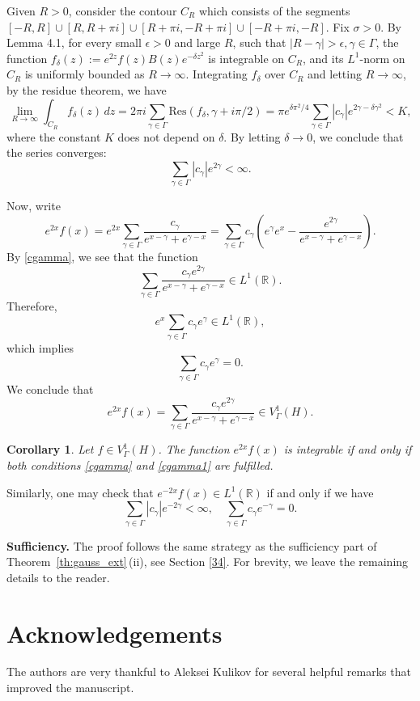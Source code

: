 \documentclass[12pt]{amsart}
\numberwithin{equation}{section}
\theoremstyle{plain}
\newtheorem{corollary}[theorem]{Corollary}
\theoremstyle{definition}
\newcommand{\R}{{\mathbb R}} \newcommand{\Q}{{\mathbb Q}} \newcommand{\Z}{{\mathbb Z}} \newcommand{\N}{{\mathbb N}}
\begin{document}
Given $R>0$, consider the contour $C_R$ which consists of the segments $[-R,R]\cup[R,R+\pi i]\cup[R+\pi i, -R+\pi i]\cup[-R+\pi i,-R]$. Fix $\sigma>0$. By  Lemma 4.1, for every small $\epsilon>0$ and large $R$, such that $|R-\gamma|>\epsilon,\gamma\in\Gamma$, the function $f_\delta(z):=e^{2z}f(z)B(z)e^{-\delta z^2}$ is integrable on $C_R$, and its $L^1$-norm on $C_R$ is uniformly bounded as $R\to\infty$. Integrating $f_\delta$ over $C_R$ and letting $R\to\infty $, by the residue theorem, we have 
$$\lim\limits_{R \to \infty}\int_{C_R}f_\delta(z)\,dz=2\pi i \sum_{\gamma\in\Gamma}\text{Res}(f_\delta,\gamma+i\pi/2)=\pi e^{\delta\pi^2/4}\sum_{\gamma\in\Gamma}|c_\gamma|e^{2\gamma-\delta \gamma^2}<K,$$where the constant $K$ does not depend on $\delta.$ By letting $\delta\to 0$, we conclude that the series converges:
\begin{equation}\label{cgamma}\sum_{\gamma\in\Gamma}|c_\gamma|e^{2\gamma}<\infty.\end{equation}

Now, write $$e^{2x}f(x)=e^{2x}\sum_{\gamma\in\Gamma}\frac{c_\gamma}{e^{x-\gamma}+e^{\gamma-x}}=\sum_{\gamma\in\Gamma}c_\gamma\left(e^\gamma e^x-\frac{e^{2\gamma}}{e^{x-\gamma}+e^{\gamma-x}}\right).$$
By \eqref{cgamma}, we see that the function $$\sum_{\gamma\in\Gamma}\frac{c_\gamma e^{2\gamma}}{e^{x-\gamma}+e^{\gamma-x}}\in L^1(\R).$$Therefore,
$$e^{x}\sum_{\gamma\in\Gamma}c_\gamma e^{\gamma}\in L^1(\R),$$which implies \begin{equation}\label{cgamma1}\sum_{\gamma\in\Gamma}c_\gamma e^{\gamma}=0.\end{equation}We conclude that 
$$e^{2x}f(x)=\sum_{\gamma\in\Gamma}\frac{c_\gamma e^{2\gamma}}{e^{x-\gamma}+e^{\gamma-x}}\in V^1_\Gamma(H).$$

\begin{corollary}\label{c43}
  Let $f\in V^1_\Gamma(H)$. The function  $e^{2x}f(x)$ is integrable if and only if both conditions \eqref{cgamma} and \eqref{cgamma1} are fulfilled.  
\end{corollary}
 Similarly, one may check that   $e^{-2x}f(x)\in L^1(\R)$ if and only if we have
 $$\sum_{\gamma\in\Gamma}|c_\gamma|e^{-2\gamma}<\infty,\quad \sum_{\gamma\in\Gamma}c_\gamma e^{-\gamma}=0.$$

{\bf Sufficiency.}
The proof follows the same strategy as the sufficiency part of Theorem~\ref{th:gauss_ext}\,(ii), see Section \ref{34}. For brevity, we leave the remaining details to the reader.

\section{Acknowledgements}
The authors are very thankful to Aleksei Kulikov for several helpful remarks that improved the manuscript.
\end{document}
